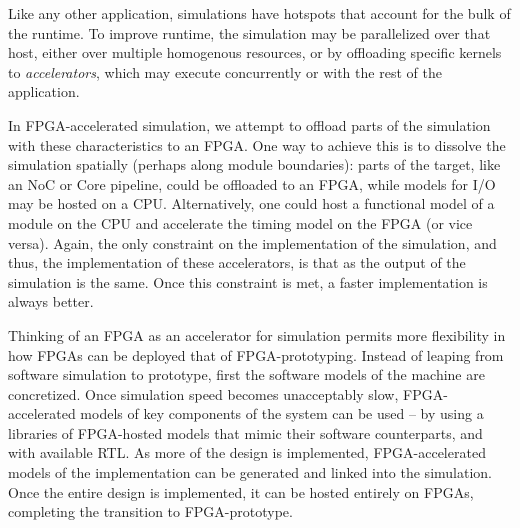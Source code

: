 Like any other application, simulations have hotspots that account for the bulk
of the runtime. To improve runtime, the simulation may be parallelized over
that host, either over multiple homogenous resources, or by offloading specific
kernels to \emph{accelerators}, which may execute concurrently or with the rest
of the application.


In FPGA-accelerated simulation, we attempt to offload parts of the simulation with
these characteristics to an FPGA. One way to achieve this is to dissolve the
simulation spatially (perhaps along module boundaries): parts of the target,
like an NoC or Core pipeline, could be offloaded to an FPGA, while models for
I/O may be hosted on a CPU.  Alternatively, one could host a functional model
of a module on the CPU and accelerate the timing model on the FPGA (or vice
versa).  Again, the only constraint on the implementation of the simulation,
and thus, the implementation of these accelerators, is that as the output of
the simulation is the same. Once this constraint is met, a faster
implementation is always better.

Thinking of an FPGA as an accelerator for simulation permits more flexibility
in how FPGAs can be deployed that of FPGA-prototyping. Instead of leaping from
software simulation to prototype, first the software models of the machine are
concretized. Once simulation speed becomes unacceptably slow, FPGA-accelerated
models of key components of the system can be used -- by using a libraries of
FPGA-hosted models that mimic their software counterparts, and with available
RTL. As more of the design is implemented, FPGA-accelerated models of the
implementation can be generated and linked into the simulation. Once the entire
design is implemented, it can be hosted entirely on FPGAs, completing the
transition to FPGA-prototype.

